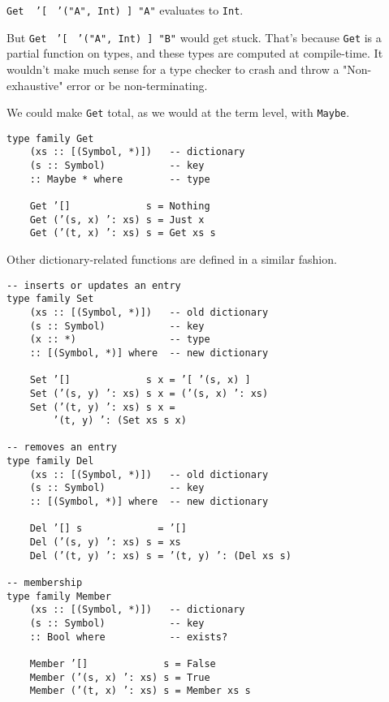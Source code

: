 \documentclass[pldi]{sigplanconf-pldi16}
\begin{document}
\texttt{Get }\texttt{ '}\texttt{[ }
\texttt{'}\texttt{("A", Int) ] "A"} evaluates to
\texttt{Int}.

But \texttt{Get }
\texttt{'}\texttt{[ }
\texttt{'}\texttt{("A", Int) ] "B"} would get stuck.
That's because \texttt{Get} is a partial function on types,
 and these types are computed at compile-time. It wouldn't make
 much sense for a type checker to crash and throw a "Non-exhaustive" error or
 be non-terminating.

We could make \texttt{Get} total, as we would at the term level,
 with \texttt{Maybe}.

\begin{verbatim}
type family Get
    (xs :: [(Symbol, *)])   -- dictionary
    (s :: Symbol)           -- key
    :: Maybe * where        -- type

    Get ’[]             s = Nothing
    Get (’(s, x) ’: xs) s = Just x
    Get (’(t, x) ’: xs) s = Get xs s
\end{verbatim}
%
Other dictionary-related functions are defined in a similar fashion.

\begin{verbatim}
-- inserts or updates an entry
type family Set
    (xs :: [(Symbol, *)])   -- old dictionary
    (s :: Symbol)           -- key
    (x :: *)                -- type
    :: [(Symbol, *)] where  -- new dictionary

    Set ’[]             s x = ’[ ’(s, x) ]
    Set (’(s, y) ’: xs) s x = (’(s, x) ’: xs)
    Set (’(t, y) ’: xs) s x =
        ’(t, y) ’: (Set xs s x)

-- removes an entry
type family Del
    (xs :: [(Symbol, *)])   -- old dictionary
    (s :: Symbol)           -- key
    :: [(Symbol, *)] where  -- new dictionary

    Del ’[] s             = ’[]
    Del (’(s, y) ’: xs) s = xs
    Del (’(t, y) ’: xs) s = ’(t, y) ’: (Del xs s)

-- membership
type family Member
    (xs :: [(Symbol, *)])   -- dictionary
    (s :: Symbol)           -- key
    :: Bool where           -- exists?

    Member ’[]             s = False
    Member (’(s, x) ’: xs) s = True
    Member (’(t, x) ’: xs) s = Member xs s
\end{verbatim}
\end{document}
